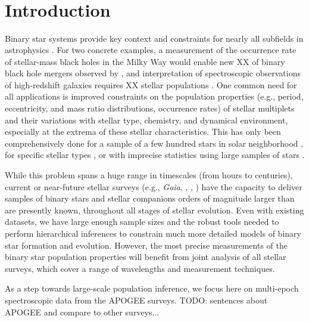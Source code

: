 \documentclass[modern]{aastex63}
\begin{document}
\keywords{}

\section*{~}\clearpage
\section{Introduction} \label{sec:intro}

Binary star systems provide key context and constraints for nearly all subfields
in astrophysics \citep[e.g.,][]{Breivik:BAAS, Rix:BAAS}.
For two concrete examples, a measurement of the occurrence rate of stellar-mass
black holes in the Milky Way would enable new XX of binary black hole mergers
observed by  \citep{LIGO:BH1, LIGO:catalog}, and interpretation of
spectroscopic observations of high-redshift galaxies requires XX stellar
populations \cite[e.g.,][]{Eldridge:2017}.
One common need for all applications is improved constraints on the population
properties (e.g., period, eccentricity, and mass ratio distributions, occurrence
rates) of stellar multiplets and their variations with stellar type, chemistry,
and dynamical environment, especially at the extrema of these stellar
characteristics.
This has only been comprehensively done for a sample of a few hundred stars in
solar neighborhood \citep{Raghavan:2010}, for specific stellar types
\citep[e.g.,][]{Moe:2017}, or with imprecise statistics using large samples of
stars \citep{Badenes:2018}.

While this problem spans a huge range in timescales (from hours to centuries),
current or near-future stellar surveys (e.g., \textit{Gaia}, \apogee,
, ) have the capacity to deliver samples of
binary stars and stellar companions orders of magnitude larger than are
presently known, throughout all stages of stellar evolution.
Even with existing datasets, we have large enough sample sizes and the robust
tools needed to perform hierarchical inferences to constrain much more detailed
models of binary star formation and evolution.
However, the most precise measurements of the binary star population properties
will benefit from joint analysis of all stellar surveys, which cover a range of
wavelengths and measurement techniques.

As a step towards large-scale population inference, we focus here on multi-epoch
spectroscopic data from the APOGEE surveys.
TODO: sentences about APOGEE and compare to other surveys...
\end{document}
